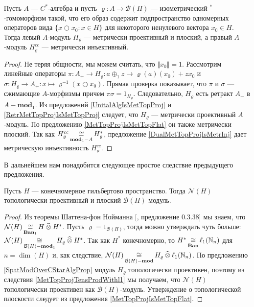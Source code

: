 \begin{proposition}\label{SpatModOverCStarAlgProp} Пусть $A$ --- $C^*$-алгебра и пусть $\varrho:A\to\mathcal{B}(H)$ --- изометрический ${}^*$-гомоморфизм такой, что его образ содержит подпространство одномерных операторов вида $\{x\bigcirc x_0:x\in H\}$ для некоторого ненулевого вектора $x_0\in H$. Тогда левый $A$-модуль $H_\varrho$ --- метрически проективный и плоский, а правый $A$-модуль $H_\varrho^{cc}$ --- метрически инъективный.
\end{proposition}
\begin{proof} Не теряя общности, мы можем считать, что $\Vert x_0\Vert=1$. Рассмотрим линейные операторы $\pi:A_+\to H_\varrho:a\oplus_1 z\mapsto \varrho(a)(x_0)+zx_0$ и $\sigma:H_\varrho\to A_+:x\mapsto \varrho^{-1}(x\bigcirc x_0)$. Прямая проверка показывает, что $\pi$ и $\sigma$ --- сжимающие $A$-морфизмы причем $\pi\sigma=1_{H_\varrho}$. Следовательно, $H_\varrho$ есть ретракт $A_+$ в $A-\mathbf{mod}_1$. Из предложений \ref{UnitalAlgIsMetTopProj} и \ref{RetrMetTopProjIsMetTopProj} следует, что $H_\varrho$ --- метрически проективный $A$-модуль. По предложению \ref{MetTopProjIsMetTopFlat} он также метрически плоский. Так как $H_\varrho^{cc}\mathop{\mathbin{\cong}}\limits_{\mathbf{mod}_1-A}H_\varrho^*$, предложение \ref{DualMetTopProjIsMetrInj} дает метрическую инъективность $H_\varrho^{cc}$.
\end{proof}

В дальнейшем нам понадобится следующее простое следствие предыдущего предложения.

\begin{proposition}\label{FinDimNHModTopProjFlat} Пусть $H$ --- конечномерное гильбертово пространство. Тогда $\mathcal{N}(H)$ топологически проективный и плоский $\mathcal{B}(H)$-модуль.
\end{proposition}
\begin{proof} Из теоремы Шаттена-фон Нойманна [\cite{HelBanLocConvAlg}, предложение 0.3.38] мы знаем, что $\mathcal{N}(H)\mathop{\mathbin{\cong}}\limits_{\mathbf{Ban}_1}H\mathbin{\widehat{\otimes}} H^*$. Пусть $\varrho=1_{\mathcal{B}(H)}$, тогда можно утверждать чуть больше: $\mathcal{N}(H)\mathop{\mathbin{\cong}}\limits_{\mathcal{B}(H)-\mathbf{mod}_1} H_\varrho\mathbin{\widehat{\otimes}} H^*$. Так как $H^*$ конечномерно, то $H^*\mathop{\mathbin{\cong}}\limits_{\mathbf{Ban}}\ell_1(\mathbb{N}_n)$ для $n=\dim(H)$ и, как следствие, $\mathcal{N}(H)\mathop{\mathbin{\cong}}\limits_{\mathcal{B}(H)-\mathbf{mod}} H_\varrho\mathbin{\widehat{\otimes}}\ell_1(\mathbb{N}_n)$. По предложению \ref{SpatModOverCStarAlgProp} модуль $H_\varrho$ топологически проективен, поэтому из следствия \ref{MetTopProjTensProdWithl1} мы получаем, что $\mathcal{N}(H)$ топологически проективен как $\mathcal{B}(H)$-модуль. Утверждение о топологической плоскости следует из предложения \ref{MetTopProjIsMetTopFlat}.
\end{proof}

